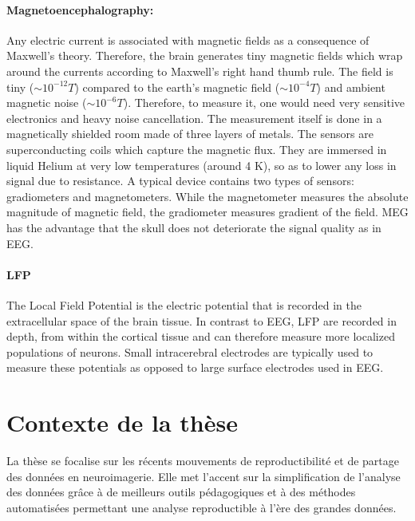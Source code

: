 \paragraph{Magnetoencephalography: } Any electric current is associated with magnetic fields as a consequence of Maxwell's theory. 
Therefore, the brain generates tiny magnetic fields which  wrap around the currents according to Maxwell's right hand thumb rule. The field is tiny ($\sim10^{-12}T$) compared to the earth's magnetic field ($\sim10^{-4}T$) and ambient magnetic noise ($\sim10^{-6}T$). Therefore, to measure it, one would need very sensitive electronics and heavy noise cancellation. The measurement itself is done in a magnetically shielded room made of three layers of metals. 
The sensors are superconducting coils which capture the magnetic flux. 
They are immersed in liquid Helium at very low temperatures (around 4 K), so as to lower any loss in signal due to resistance. A typical device contains two types of sensors: gradiometers and magnetometers. While the magnetometer measures the absolute magnitude of magnetic field, the gradiometer measures gradient of the field. \Ac{MEG} has the advantage that the skull does not deteriorate the signal quality as in \ac{EEG}.

\paragraph{\Ac{LFP}}
The Local Field Potential is the electric potential that is recorded in the extracellular space of the brain tissue. In contrast to \ac{EEG}, \ac{LFP} are recorded in depth, from within the cortical tissue and can therefore measure more localized populations of neurons. Small intracerebral electrodes are typically used to measure these potentials as opposed to large surface electrodes used in \ac{EEG}.

\section*{Contexte de la thèse}
La thèse se focalise sur les récents mouvements de reproductibilité et de partage des données en neuroimagerie. Elle met l'accent sur la simplification de l'analyse des données grâce à de meilleurs outils pédagogiques et à des méthodes automatisées permettant une analyse reproductible à l'ère des grandes données.

